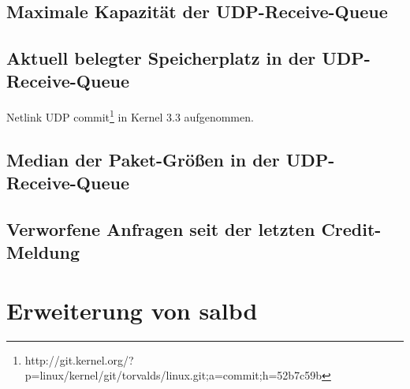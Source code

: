 \documentclass[a4paper, 12pt, BCOR10mm, DIV12, toc=bibliography, toc=listof, german]{scrbook}
\begin{document}
		$~$\\
		\subsection*{Maximale Kapazität der UDP-Receive-Queue} %
		
		
		

		\subsection*{Aktuell belegter Speicherplatz in der UDP-Receive-Queue} %
		
		Netlink UDP commit\footnote{http://git.kernel.org/?p=linux/kernel/git/torvalds/linux.git;a=commit;h=52b7c59b}
		in Kernel 3.3 aufgenommen.
		

		\subsection*{Median der Paket-Größen in der UDP-Receive-Queue} %
		
		

		\subsection*{Verworfene Anfragen seit der letzten Credit-Meldung} %
		
		

			


		\section{Erweiterung von salbd} %
		\label{sec:erweiterung}
			
\end{document}

